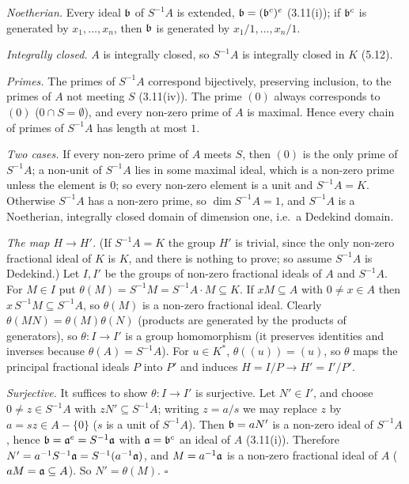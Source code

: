 \documentclass[11pt]{article}
\begin{document}
\emph{Noetherian.} Every ideal $\mathfrak b$ of $S^{-1}A$ is extended, $\mathfrak b=(\mathfrak b^c)^e$ (3.11(i)); if $\mathfrak b^c$ is generated by $x_1,\dots,x_n$, then $\mathfrak b$ is generated by $x_1/1,\dots,x_n/1$.

\emph{Integrally closed.} $A$ is integrally closed, so $S^{-1}A$ is integrally closed in $K$ (5.12).

\emph{Primes.} The primes of $S^{-1}A$ correspond bijectively, preserving inclusion, to the primes of $A$ not meeting $S$ (3.11(iv)). The prime $(0)$ always corresponds to $(0)$ ($0\cap S=\emptyset$), and every non-zero prime of $A$ is maximal. Hence every chain of primes of $S^{-1}A$ has length at most $1$.

\emph{Two cases.} If every non-zero prime of $A$ meets $S$, then $(0)$ is the only prime of $S^{-1}A$; a non-unit of $S^{-1}A$ lies in some maximal ideal, which is a non-zero prime unless the element is $0$; so every non-zero element is a unit and $S^{-1}A=K$. Otherwise $S^{-1}A$ has a non-zero prime, so $\dim S^{-1}A=1$, and $S^{-1}A$ is a Noetherian, integrally closed domain of dimension one, i.e.\ a Dedekind domain.

\emph{The map $H\to H'$.} (If $S^{-1}A=K$ the group $H'$ is trivial, since the only non-zero fractional ideal of $K$ is $K$, and there is nothing to prove; so assume $S^{-1}A$ is Dedekind.) Let $I,I'$ be the groups of non-zero fractional ideals of $A$ and $S^{-1}A$. For $M\in I$ put $\theta(M)=S^{-1}M=S^{-1}A\cdot M\subseteq K$. If $xM\subseteq A$ with $0\ne x\in A$ then $x\,S^{-1}M\subseteq S^{-1}A$, so $\theta(M)$ is a non-zero fractional ideal. Clearly $\theta(MN)=\theta(M)\theta(N)$ (products are generated by the products of generators), so $\theta:I\to I'$ is a group homomorphism (it preserves identities and inverses because $\theta(A)=S^{-1}A$). For $u\in K^*$, $\theta((u))=(u)$, so $\theta$ maps the principal fractional ideals $P$ into $P'$ and induces $H=I/P\to H'=I'/P'$.

\emph{Surjective.} It suffices to show $\theta:I\to I'$ is surjective. Let $N'\in I'$, and choose $0\ne z\in S^{-1}A$ with $zN'\subseteq S^{-1}A$; writing $z=a/s$ we may replace $z$ by $a=sz\in A-\{0\}$ ($s$ is a unit of $S^{-1}A$). Then $\mathfrak b=aN'$ is a non-zero ideal of $S^{-1}A$, hence $\mathfrak b=\mathfrak a^e=S^{-1}\mathfrak a$ with $\mathfrak a=\mathfrak b^c$ an ideal of $A$ (3.11(i)). Therefore $N'=a^{-1}S^{-1}\mathfrak a=S^{-1}(a^{-1}\mathfrak a)$, and $M=a^{-1}\mathfrak a$ is a non-zero fractional ideal of $A$ ($aM=\mathfrak a\subseteq A$). So $N'=\theta(M)$. \hfill$\square$
\end{document}
